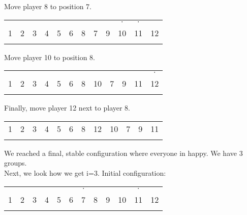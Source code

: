 \documentclass[../main.tex]{subfiles}
\begin{document}
Move player 8 to position 7.
 \begin{table}[H]
\begin{center}
{\begin{tabular}{| c |c| c| c| c |c| c |c|c|c|c|c| }
\hline
 &  &  & & & &  & &  &$\cdot$ &$\cdot$ &\\
1 & 2 &3 &4 & 5 &6  &8 &7 & 9& 10&11&12\\
\x&\x & \x &\z &\z &\z & \z &\x  &\x &\z &\x&\z \\
 \hline
\end{tabular}}
\end{center}
\end{table}

Move player 10 to position 8.
 \begin{table}[H]
\begin{center}
{\begin{tabular}{| c |c| c| c| c |c| c |c|c|c|c|c| }
\hline
 &  &  & & & &  & &  & & &$\cdot$\\
1 & 2 &3 &4 & 5 &6  &8 &10 &7 & 9&11&12\\
\x&\x & \x &\z &\z &\z & \z &\z  &\x &\x &\x&\z \\
 \hline
\end{tabular}}
\end{center}
\end{table}
Finally, move player 12 next to player 8.
 \begin{table}[H]
\begin{center}
{\begin{tabular}{| c |c| c| c| c |c| c |c|c|c|c|c| }
\hline
1 & 2 &3 &4 & 5 &6  &8 &12 &10 & 7&9&11\\
\x&\x & \x &\z &\z &\z & \z &\z  &\z &\x &\x&\x \\
 \hline
\end{tabular}}
\end{center}
\end{table}
We reached a final, stable configuration where everyone in happy. We have 3 groups.\\

Next, we look how we get i=3. Initial configuration:
 \begin{table}[H]
\begin{center}
{\begin{tabular}{| c |c| c| c| c |c| c |c|c|c|c|c| }
\hline
 &  &  & & & & $\cdot$ & &  & &$\cdot$ &\\
1 & 2 &3 &4 & 5 &6  &7 &8 & 9& 10&11&12\\
\x&\x & \x &\z &\z &\z & \x &\z  &\x &\z &\x&\z \\
 \hline
\end{tabular}}
\end{center}
\end{table}
\end{document}
